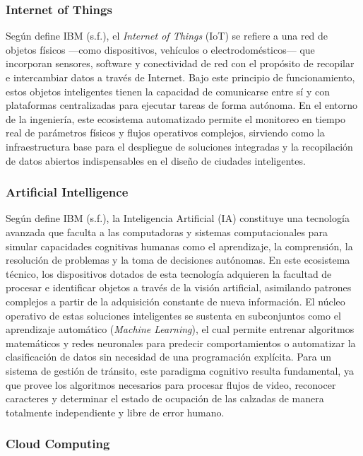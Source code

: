 \documentclass[12pt,a4paper]{article}
\begin{document}
\subsubsection{Internet of Things}

Según define IBM (s.f.), el \textit{Internet of Things} (IoT) se refiere a una red de objetos físicos —como dispositivos, vehículos o electrodomésticos— que incorporan sensores, software y conectividad de red con el propósito de recopilar e intercambiar datos a través de Internet. Bajo este principio de funcionamiento, estos objetos inteligentes tienen la capacidad de comunicarse entre sí y con plataformas centralizadas para ejecutar tareas de forma autónoma. En el entorno de la ingeniería, este ecosistema automatizado permite el monitoreo en tiempo real de parámetros físicos y flujos operativos complejos, sirviendo como la infraestructura base para el despliegue de soluciones integradas y la recopilación de datos abiertos indispensables en el diseño de ciudades inteligentes.

\subsubsection{Artificial Intelligence}

Según define IBM (s.f.), la Inteligencia Artificial (IA) constituye una tecnología avanzada que faculta a las computadoras y sistemas computacionales para simular capacidades cognitivas humanas como el aprendizaje, la comprensión, la resolución de problemas y la toma de decisiones autónomas. En este ecosistema técnico, los dispositivos dotados de esta tecnología adquieren la facultad de procesar e identificar objetos a través de la visión artificial, asimilando patrones complejos a partir de la adquisición constante de nueva información. El núcleo operativo de estas soluciones inteligentes se sustenta en subconjuntos como el aprendizaje automático (\textit{Machine Learning}), el cual permite entrenar algoritmos matemáticos y redes neuronales para predecir comportamientos o automatizar la clasificación de datos sin necesidad de una programación explícita. Para un sistema de gestión de tránsito, este paradigma cognitivo resulta fundamental, ya que provee los algoritmos necesarios para procesar flujos de video, reconocer caracteres y determinar el estado de ocupación de las calzadas de manera totalmente independiente y libre de error humano.

\subsubsection{Cloud Computing}
\end{document}
